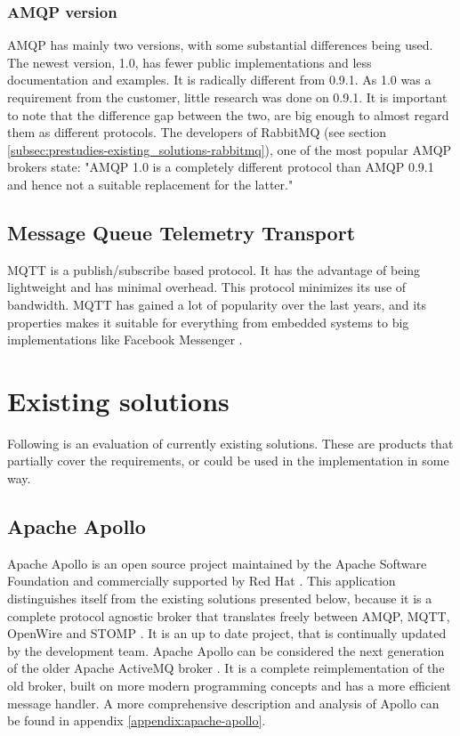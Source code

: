 \subsubsection{AMQP version}
\label{subsec:prestudies-amqp-amqp_version}
AMQP has mainly two versions, with some substantial differences being used. The newest version, 1.0, has fewer public implementations and less documentation and examples. It is radically different from 0.9.1. As 1.0 was a requirement from the customer, little research was done on 0.9.1. It is important to note that the difference gap between the two, are big enough to almost regard them as different protocols. The developers of RabbitMQ (see section \ref{subsec:prestudies-existing_solutions-rabbitmq}), one of the most popular AMQP brokers state: "AMQP 1.0 is a completely different protocol than AMQP 0.9.1 and hence not a suitable replacement for the latter."

\subsection{Message Queue Telemetry Transport}
\label{subsec:prestudies-mqtt}
MQTT is a publish/subscribe based protocol. It has the advantage of being lightweight and has minimal overhead. This protocol minimizes its use of bandwidth. MQTT has gained a lot of popularity over the last years, and its properties makes it suitable for everything from embedded systems to big implementations like Facebook Messenger \cite{facebook-messenger}.

\section{Existing solutions}
\label{subsec:prestudies-existing_solutions}

Following is an evaluation of currently existing solutions. These are products that partially cover the requirements, or could be used in the implementation in some way.

\subsection{Apache Apollo}
\label{subsec:prestudies-existing_solutions-apache_apollo}

Apache Apollo \cite{apache-apollo} is an open source project maintained by the Apache Software Foundation \cite{apache} and commercially supported by Red Hat \cite{red-hat}. This application distinguishes itself from the existing solutions presented below, because it is a complete protocol agnostic broker that translates freely between AMQP, MQTT, OpenWire \cite{openwire} and STOMP \cite{stomp}. It is an up to date project, that is continually updated by the development team. Apache Apollo can be considered the next generation of the older Apache ActiveMQ broker \cite{activemq}. It is a complete reimplementation of the old broker, built on more modern programming concepts and has a more efficient message handler. A more comprehensive description and analysis of Apollo can be found in appendix \ref{appendix:apache-apollo}.

